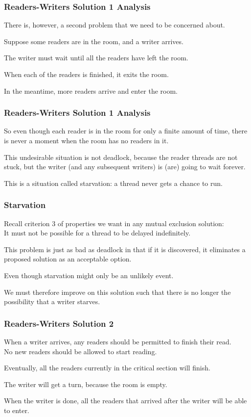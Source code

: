 \begin{frame}
	\frametitle{Readers-Writers Solution 1 Analysis}

	There is, however, a second problem that we need to be concerned about.

	Suppose some readers are in the room, and a writer arrives.

	The writer must wait until all the readers have left the room.

	When each of the readers is finished, it exits the room.

	In the meantime, more readers arrive and enter the room.
\end{frame}


\begin{frame}
	\frametitle{Readers-Writers Solution 1 Analysis}

	So even though each reader is in the room for only a finite amount of time, there is never a moment when the room has no readers in it.

	This undesirable situation is not deadlock, because the reader threads are not stuck, but the writer (and any subsequent writers) is (are) going to wait forever.

	This is a situation called \alert{starvation}: a thread never gets a chance to run.


\end{frame}


\begin{frame}
	\frametitle{Starvation}

	Recall criterion 3 of properties we want in any mutual exclusion solution:\\
	\quad It must not be possible for a thread to be delayed indefinitely.

	This problem is just as bad as deadlock in that if it is discovered, it eliminates a proposed solution as an acceptable option.

	Even though starvation might only be an unlikely event.

	We must therefore improve on this solution such that there is no longer the possibility that a writer starves.


\end{frame}


\begin{frame}
	\frametitle{Readers-Writers Solution 2}

	When a writer arrives, any readers should be permitted to finish their read.\\
	\quad No new readers should be allowed to start reading.

	Eventually, all the readers currently in the critical section will finish.

	The writer will get a turn, because the room is empty.

	When the writer is done, all the readers that arrived after the writer will be able to enter.

\end{frame}

